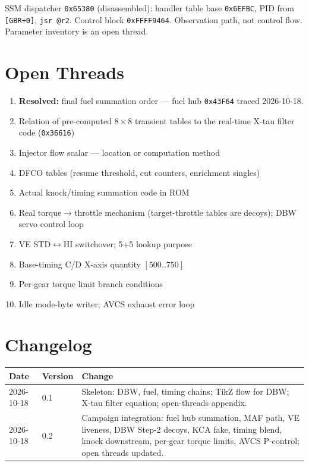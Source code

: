 \documentclass[11pt,a4paper]{book}
\begin{document}
SSM dispatcher \texttt{0x65380} (disassembled): handler table base
\texttt{0x6EFBC}, PID from \texttt{[GBR+0]}, \texttt{jsr @r2}.
Control block \texttt{0xFFFF9464}. Observation path, not control flow.
Parameter inventory is an open thread.

\appendix
\chapter{Open Threads}

\begin{enumerate}
  \item \textbf{Resolved:} final fuel summation order --- fuel hub
        \texttt{0x43F64} traced 2026-10-18.
  \item Relation of pre-computed $8\times8$ transient tables to the
        real-time X-tau filter code (\texttt{0x36616})
  \item Injector flow scalar --- location or computation method
  \item DFCO tables (resume threshold, cut counters, enrichment singles)
  \item Actual knock/timing summation code in ROM
  \item Real torque$\rightarrow$throttle mechanism (target-throttle tables
        are decoys); DBW servo control loop
  \item VE STD$\leftrightarrow$HI switchover; 5+5 lookup purpose
  \item Base-timing C/D X-axis quantity $[500..750]$
  \item Per-gear torque limit branch conditions
  \item Idle mode-byte writer; AVCS exhaust error loop
\end{enumerate}

\chapter{Changelog}

\begin{tabular}{llp{9cm}}
\toprule
Date & Version & Change \\
\midrule
2026-10-18 & 0.1 & Skeleton: DBW, fuel, timing chains; TikZ flow for DBW;
                    X-tau filter equation; open-threads appendix. \\
2026-10-18 & 0.2 & Campaign integration: fuel hub summation, MAF path, VE
                    liveness, DBW Step-2 decoys, KCA fake, timing blend,
                    knock downstream, per-gear torque limits, AVCS P-control;
                    open threads updated. \\
\bottomrule
\end{tabular}
\end{document}
